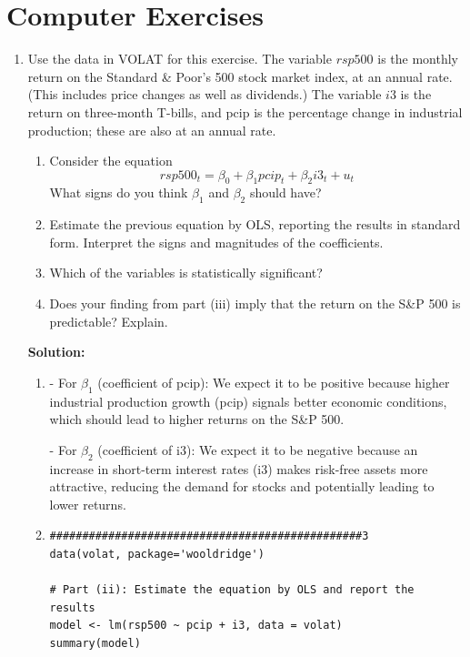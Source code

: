\documentclass[12pt]{article}
\begin{document}
\section*{Computer Exercises}

\begin{enumerate}

\item Use the data in VOLAT for this exercise. The variable $r s p 500$ is the monthly return on the Standard \& Poor's 500 stock market index, at an annual rate. (This includes price changes as well as dividends.) The variable $i 3$ is the return on three-month T-bills, and pcip is the percentage change in industrial production; these are also at an annual rate.
\begin{enumerate}
    \item Consider the equation
$$
r s p 500_t=\beta_0+\beta_1 p c i p_t+\beta_2 i 3_t+u_t
$$
What signs do you think $\beta_1$ and $\beta_2$ should have?
\item  Estimate the previous equation by OLS, reporting the results in standard form. Interpret the signs and magnitudes of the coefficients.
\item  Which of the variables is statistically significant?
\item  Does your finding from part (iii) imply that the return on the S\&P 500 is predictable? Explain.
\end{enumerate}



{\color{blue}
\noindent \textbf{Solution:}

\begin{enumerate}
    \item - For $\beta_1$ (coefficient of pcip): We expect it to be positive because higher industrial production growth (pcip) signals better economic conditions, which should lead to higher returns on the S\&P 500.

    - For $\beta_2$ (coefficient of i3): We expect it to be negative because an increase in short-term interest rates (i3) makes risk-free assets more attractive, reducing the demand for stocks and potentially leading to lower returns.

    \item 
    \begin{lstlisting}
################################################3
data(volat, package='wooldridge')

# Part (ii): Estimate the equation by OLS and report the results
model <- lm(rsp500 ~ pcip + i3, data = volat)
summary(model)


\end{lstlisting}
\end{enumerate}}
\end{enumerate}
\end{document}
